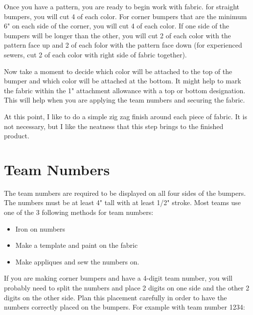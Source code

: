 \documentclass[
10pt, %
a4paper, %
oneside, %
headinclude,footinclude, %
BCOR5mm, %
]{scrartcl}
\begin{document}
Once you have a pattern, you are ready to begin work with fabric. for straight bumpers, you will cut 4 of each color. For corner bumpers that are the minimum 6" on each side of the corner, you will cut 4 of each color. If one side of the bumpers will be longer than the other, you will cut 2 of each color with the pattern face up and 2 of each folor with the pattern face down (for experienced sewers, cut 2 of each color with right side of fabric together).

Now take a moment to decide which color will be attached to the top of the bumper and which color will be attached at the bottom. It might help to mark the fabric within the 1" attachment allowance with a top or bottom designation. This will help when you are applying the team numbers and securing the fabric.

At this point, I like to do a simple zig zag finish around each piece of fabric. It is not necessary, but I like the neatness that this step brings to the finished product.


\section{Team Numbers}

The team numbers are required to be displayed on all four sides of the bumpers. The numbers must be at least 4" tall with at least 1/2" stroke. Most teams use one of the 3 following methods for team numbers:
\begin{itemize}
	\item Iron on numbers
	\item Make a template and paint on the fabric
	\item Make appliques and sew the numbers on.
\end{itemize}
If you are making corner bumpers and have a 4-digit team number, you will probably need to split the numbers and place 2 digits on one side and the other 2 digits on the other side. Plan this placement carefully in order to have the numbers correctly placed on the bumpers. For example with team number 1234:
\end{document}
